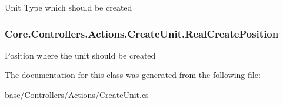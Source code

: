 Unit Type which should be created 

\hypertarget{classCore_1_1Controllers_1_1Actions_1_1CreateUnit_a75330207d1027fb83f97d8973ae355f3}{}
\subsubsection[{Real\+Create\+Position}]{ Core.\+Controllers.\+Actions.\+Create\+Unit.\+Real\+Create\+Position}\label{classCore_1_1Controllers_1_1Actions_1_1CreateUnit_a75330207d1027fb83f97d8973ae355f3}


Position where the unit should be created 



The documentation for this class was generated from the following file\+:\begin{DoxyCompactItemize}
\item 
base/\+Controllers/\+Actions/Create\+Unit.\+cs\end{DoxyCompactItemize}

